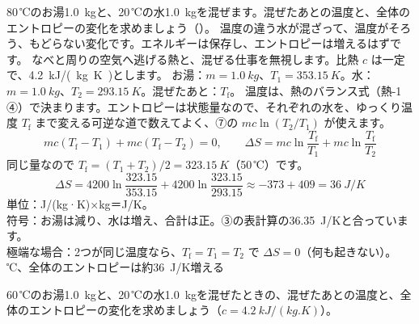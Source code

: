 \label{ph:熱-6:ex1}
\begin{phreidai}[お湯と水を混ぜたときのエントロピー]
80\,℃のお湯\qty{1.0}{kg}と、20\,℃の水\qty{1.0}{kg}を混ぜます。混ぜたあとの温度と、全体のエントロピーの変化を求めましょう（\bkhatenaref）。
\phbamen
温度の違う水が混ざって、温度がそろう、もどらない変化です。エネルギーは保存し、エントロピーは増えるはずです。
\phmushi
なべと周りの空気へ逃げる熱と、混ぜる仕事を無視します。比熱 $c$ は一定で、\qty{4.2}{kJ/(kg.K)}とします。
\phzu
お湯：$m=\qty{1.0}{kg}$、$T_1=\qty{353.15}{K}$。水：$m=\qty{1.0}{kg}$、$T_2=\qty{293.15}{K}$。混ぜたあと：$T_{\mathrm f}$。
\phriyu
温度は、熱のバランス式（熱-1 ④）で決まります。エントロピーは状態量なので、それぞれの水を、ゆっくり温度 $T_{\mathrm f}$ まで変える可逆な道で数えてよく、⑦の $mc\ln(T_2/T_1)$ が使えます。
\phtateru
\[mc(T_{\mathrm f}-T_1)+mc(T_{\mathrm f}-T_2)=0,\qquad \Delta S=mc\ln\frac{T_{\mathrm f}}{T_1}+mc\ln\frac{T_{\mathrm f}}{T_2}\]
\phtoku
同じ量なので $T_{\mathrm f}=(T_1+T_2)/2=\qty{323.15}{K}$（50\,℃）です。
\[\Delta S=4200\ln\frac{323.15}{353.15}+4200\ln\frac{323.15}{293.15}\approx-373+409=\qty{36}{J/K}\]
\phtashikame
単位：J/(kg·K)×kg＝J/K。\\
符号：お湯は減り、水は増え、合計は正。③の表計算の\qty{36.35}{J/K}と合っています。\\
極端な場合：2つが同じ温度なら、$T_{\mathrm f}=T_1=T_2$ で $\Delta S=0$（何も起きない）。
\,℃、全体のエントロピーは約\qty{36}{J/K}増える
\end{phreidai}
\begin{jibun}
60\,℃のお湯\qty{1.0}{kg}と、20\,℃の水\qty{1.0}{kg}を混ぜたときの、混ぜたあとの温度と、全体のエントロピーの変化を求めましょう（$c=\qty{4.2}{kJ/(kg.K)}$）。
\end{jibun}

